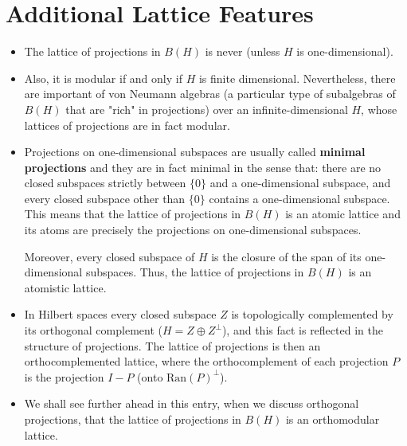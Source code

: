 \documentclass[12pt]{article}
\begin{document}
\section{Additional Lattice Features}
\begin{itemize}
\item The lattice of projections in $B(H)$ is never  (unless $H$ is one-dimensional).
\end{itemize}
\begin{itemize}
\item Also, it is modular if and only if $H$ is finite dimensional. Nevertheless, there are important  of von Neumann algebras (a particular type of subalgebras of $B(H)$ that are "rich" in projections) over an infinite-dimensional $H$, whose lattices of projections are in fact modular.
\end{itemize}
\begin{itemize}
\item Projections on one-dimensional subspaces are usually called {\bf minimal projections} and they are in fact minimal in the sense that: there are no closed subspaces strictly between $\{0\}$ and a one-dimensional subspace, and every closed subspace other than $\{0\}$ contains a one-dimensional subspace. This means that the lattice of projections in $B(H)$ is an atomic lattice and its atoms are precisely the projections on one-dimensional subspaces.

Moreover, every closed subspace of $H$ is the closure of the span of its one-dimensional subspaces. Thus, the lattice of projections in $B(H)$ is an atomistic lattice.
\end{itemize}
\begin{itemize}
\item In Hilbert spaces every closed subspace $Z$ is topologically complemented by its orthogonal complement ($H=Z \oplus Z^{\perp}$), and this fact is reflected in the structure of projections. The lattice of projections is then an orthocomplemented lattice, where the orthocomplement of each projection $P$ is the projection $I-P$ (onto $\mathrm{Ran}(P)^{\perp}$).
\end{itemize}
\begin{itemize}
\item We shall see further ahead in this entry, when we discuss orthogonal projections, that the lattice of projections in $B(H)$ is an orthomodular lattice.
\end{itemize}
\end{document}
